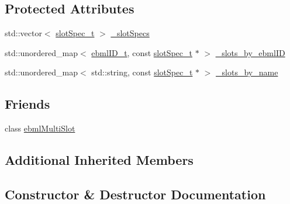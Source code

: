 \subsection*{Protected Attributes}
\begin{DoxyCompactItemize}
\item 
std\+::vector$<$ \mbox{\hyperlink{classebml_1_1slotSpec__t}{slot\+Spec\+\_\+t}} $>$ \mbox{\hyperlink{classebml_1_1ebmlMultiSlotClass_acf45df8a12023df6aca62e56b0048c46}{\+\_\+slot\+Specs}}
\item 
std\+::unordered\+\_\+map$<$ \mbox{\hyperlink{namespaceebml_a86c5f604ddf12a74aa9812e997a58691}{ebml\+I\+D\+\_\+t}}, const \mbox{\hyperlink{classebml_1_1slotSpec__t}{slot\+Spec\+\_\+t}} $\ast$ $>$ \mbox{\hyperlink{classebml_1_1ebmlMultiSlotClass_a714ffe27d02c980fbc01035afdda9b4d}{\+\_\+slots\+\_\+by\+\_\+ebml\+ID}}
\item 
std\+::unordered\+\_\+map$<$ std\+::string, const \mbox{\hyperlink{classebml_1_1slotSpec__t}{slot\+Spec\+\_\+t}} $\ast$ $>$ \mbox{\hyperlink{classebml_1_1ebmlMultiSlotClass_ad3b985976d72238ed96dba0b49540e4d}{\+\_\+slots\+\_\+by\+\_\+name}}
\end{DoxyCompactItemize}
\subsection*{Friends}
\begin{DoxyCompactItemize}
\item 
class \mbox{\hyperlink{classebml_1_1ebmlMultiSlotClass_ab14eb6c5a125d7276a7b4b5b6573428b}{ebml\+Multi\+Slot}}
\end{DoxyCompactItemize}
\subsection*{Additional Inherited Members}


\subsection{Constructor \& Destructor Documentation}
\mbox{\label{classebml_1_1ebmlMultiSlotClass_ac21125f15a5af98e4aa6e8ce494c8667}} 
